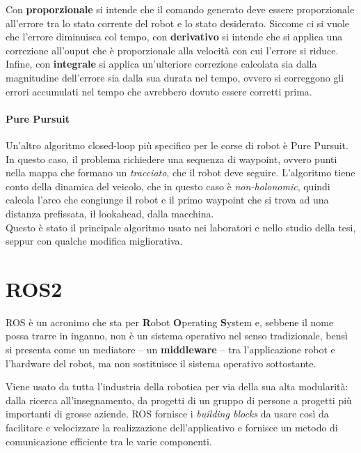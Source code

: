 Con \textbf{proporzionale} si intende che il comando generato deve essere proporzionale all'errore tra lo
stato corrente del robot e lo stato desiderato.
Siccome ci si vuole che l'errore diminuisca col tempo, con \textbf{derivativo} si intende che si applica
una correzione all'ouput che è proporzionale alla velocità con cui l’errore si riduce.
Infine, con \textbf{integrale} si applica un'ulteriore correzione calcolata sia dalla magnitudine
dell'errore sia dalla sua durata nel tempo, ovvero si correggono gli errori accumulati nel tempo che
avrebbero dovuto essere corretti prima.

\paragraph{Pure Pursuit} \cite{lection10}
Un'altro algoritmo closed-loop più specifico per le corse di robot è Pure Pursuit. In questo caso, il
problema richiedere una sequenza di waypoint, ovvero punti nella mappa che formano un \textit{tracciato},
che il robot deve seguire. L'algoritmo tiene conto della dinamica del veicolo, che in questo caso è
\textit{non-holonomic}, quindi calcola l'arco che congiunge il robot e il primo waypoint che si trova ad
una distanza prefissata, il lookahead, dalla macchina.\\
Questo è stato il principale algoritmo usato nei laboratori e nello studio della tesi, seppur con qualche
modifica migliorativa.


\section{ROS2}
\label{sec:ros}
ROS è un acronimo che sta per \textbf{R}obot \textbf{O}perating \textbf{S}ystem e,
sebbene il nome possa trarre in inganno, non è un sistema operativo nel senso tradizionale,
bensì si presenta come un mediatore -- un \textbf{middleware} -- tra l'applicazione robot
e l'hardware del robot, ma non sostituisce il sistema operativo sottostante. \cite{ros-ecosystem}\cite{scirobotics}

Viene usato da tutta l'industria della robotica per via della sua alta modularità:
dalla ricerca all'insegnamento, da progetti di un gruppo di persone a progetti più importanti
di grosse aziende. ROS fornisce i \textit{building blocks} da usare così da facilitare e velocizzare
la realizzazione dell'applicativo e fornisce un metodo di comunicazione efficiente tra le varie componenti.

